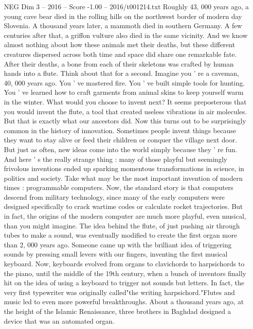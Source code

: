 \begin{textsample}{NEG Dim 3 – 2016 – Score -1.00 – 2016/t001214.txt}  \label{ex:f3_neg_075}
Roughly 43, 000 years ago, a young cave bear died in the rolling hills on the northwest border of modern day Slovenia.
A thousand years later, a mammoth died in southern Germany.
A few centuries after that, a griffon vulture also died in the same vicinity.
And we know almost nothing about how these animals met their deaths, but these different creatures dispersed across both time and space did share one remarkable fate.
After their deaths, a bone from each of their skeletons was crafted by human hands into a flute.
Think about that for a second.
Imagine you ' re a caveman, 40, 000 years ago.
You ' ve mastered fire.
You ' ve built simple tools for hunting.
You ' ve learned how to craft garments from animal skins to keep yourself warm in the winter.
What would you choose to invent next?
It seems preposterous that you would invent the flute, a tool that created useless vibrations in air molecules.
But that is exactly what our ancestors did.
Now this turns out to be surprisingly common in the history of innovation.
Sometimes people invent things because they want to stay alive or feed their children or conquer the village next door.
But just as often, new ideas come into the world simply because they ' re fun.
And here ' s the really strange thing : many of those playful but seemingly frivolous inventions ended up sparking momentous transformations in science, in politics and society.
Take what may be the most important invention of modern times : programmable computers.
Now, the standard story is that computers descend from military technology, since many of the early computers were designed specifically to crack wartime codes or calculate rocket trajectories.
But in fact, the origins of the modern computer are much more playful, even musical, than you might imagine.
The idea behind the flute, of just pushing air through tubes to make a sound, was eventually modified to create the first organ more than 2, 000 years ago.
Someone came up with the brilliant idea of triggering sounds by pressing small levers with our fingers, inventing the first musical keyboard.
Now, keyboards evolved from organs to clavichords to harpsichords to the piano, until the middle of the 19th century, when a bunch of inventors finally hit on the idea of using a keyboard to trigger not sounds but letters.
In fact, the very first typewriter was originally called"the writing harpsichord."Flutes and music led to even more powerful breakthroughs.
About a thousand years ago, at the height of the Islamic Renaissance, three brothers in Baghdad designed a device that was an automated organ.

\end{textsample}
